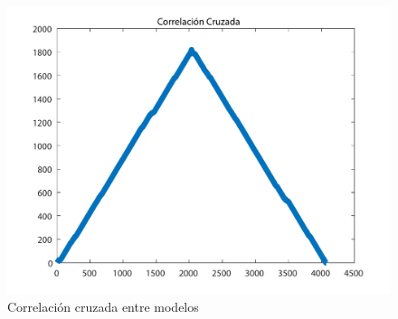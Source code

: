 \begin{figure}[!ht]
	\centering
		\includegraphics[scale=0.6]{./Figures/xcorrANN}
	\caption{Correlación cruzada entre modelos}
	\label{fig:xcorr}
\end{figure}

